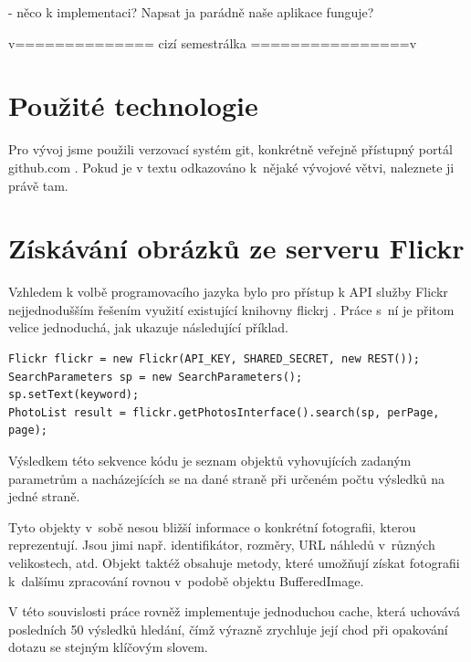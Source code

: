 \documentclass[12pt,oneside,a4paper]{article}
\newenvironment{listing}
{\begin{list}{}{\setlength{\leftmargin}{1em}}\item\scriptsize\bfseries}
{\end{list}}
\begin{document}
- něco k implementaci? Napsat ja parádně naše aplikace funguje?

\iffalse
v============== cizí semestrálka ================v

\section{Použité technologie}


Pro vývoj jsme použili verzovací systém git, konkrétně veřejně přístupný portál github.com \cite{official}. Pokud je v textu odkazováno k~nějaké vývojové větvi, naleznete ji právě tam.

\section{Získávání obrázků ze serveru Flickr}
Vzhledem k volbě programovacího jazyka bylo pro přístup k API služby Flickr nejjednodušším řešením využití existující knihovny flickrj \cite{flickrj}. Práce s~ní je přitom velice jednoduchá, jak ukazuje následující příklad.

\begin{listing}
\begin{verbatim}
Flickr flickr = new Flickr(API_KEY, SHARED_SECRET, new REST());
SearchParameters sp = new SearchParameters();
sp.setText(keyword);
PhotoList result = flickr.getPhotosInterface().search(sp, perPage, page);
\end{verbatim}
\end{listing}

Výsledkem této sekvence kódu je seznam objektů vyhovujících zadaným parametrům a nacházejících se na dané straně při určeném počtu výsledků na jedné straně.

Tyto objekty v~sobě nesou bližší informace o konkrétní fotografii, kterou reprezentují. Jsou jimi např. identifikátor, rozměry, URL náhledů v~různých velikostech, atd. Objekt taktéž obsahuje metody, které umožňují získat fotografii k~dalšímu zpracování rovnou v~podobě objektu BufferedImage.

V této souvislosti práce rovněž implementuje jednoduchou cache, která uchovává posledních 50 výsledků hledání, čímž výrazně zrychluje její chod při opakování dotazu se stejným klíčovým slovem.
\end{document}
